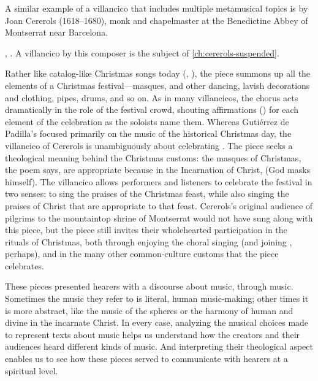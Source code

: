 A similar example of a villancico that includes multiple metamusical topics is  by Joan Cererols (1618--1680), monk and chapelmaster at the Benedictine Abbey of Montserrat near Barcelona.%
\begin{Footnote}
    , \autocite[81--94]{Cererols:MEM-VC}.
    A villancico by this composer is the subject of
    \cref{ch:cererols-suspended}.
\end{Footnote}
Rather like catalog-like Christmas songs today (,
), the piece summons up all the
elements of a Christmas festival---masques,  and other
dancing, lavish decorations and clothing, pipes, drums, and so on.
As in many villancicos, the chorus acts dramatically in the role of the
festival crowd, shouting affirmations () for each element of
the celebration as the soloists name them.  
Whereas Gutiérrez de Padilla's  focused
primarily on the music of the historical Christmas day, the villancico of
Cererols is unambiguously about celebrating .
The piece seeks a theological meaning behind the Christmas customs: the masques
of Christmas, the poem says, are appropriate because in the Incarnation of
Christ,  (God masks himself).
The villancico allows performers and listeners to celebrate the festival in two
senses: to sing the praises of the Christmas feast, while also singing the
praises of Christ that are appropriate to that feast. 
Cererols's original audience of pilgrims to the mountaintop shrine of
Montserrat would not have sung along with this piece, but the piece still
invites their wholehearted participation in the rituals of Christmas, both
through enjoying the choral singing (and joining , perhaps),
and in the many other common-culture customs that the piece celebrates.

These pieces presented hearers with a discourse about music, through music.
Sometimes the music they refer to is literal, human music-making; other times
it is more abstract, like the music of the spheres or the harmony of human and
divine in the incarnate Christ.
In every case, analyzing the musical choices made to represent texts about
music helps us understand how the creators and their audiences heard different
kinds of music.
And interpreting their theological aspect enables us to see how these pieces
served to communicate with hearers at a spiritual level.

